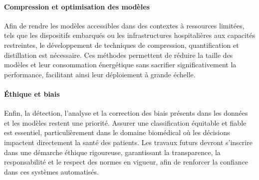 \documentclass[12pt]{report}
\begin{document}
\paragraph{Compression et optimisation des modèles}  
Afin de rendre les modèles accessibles dans des contextes à ressources limitées, tels que les dispositifs embarqués ou les infrastructures hospitalières aux capacités restreintes, le développement de techniques de compression, quantification et distillation est nécessaire. Ces méthodes permettent de réduire la taille des modèles et leur consommation énergétique sans sacrifier significativement la performance, facilitant ainsi leur déploiement à grande échelle.

\paragraph{Éthique et biais}  
Enfin, la détection, l’analyse et la correction des biais présents dans les données et les modèles restent une priorité. Assurer une classification équitable et fiable est essentiel, particulièrement dans le domaine biomédical où les décisions impactent directement la santé des patients. Les travaux futurs devront s’inscrire dans une démarche éthique rigoureuse, garantissant la transparence, la responsabilité et le respect des normes en vigueur, afin de renforcer la confiance dans ces systèmes automatisés.
\end{document}
